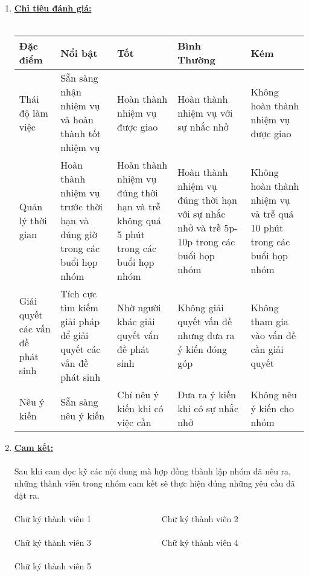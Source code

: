 \documentclass[12pt]{article}
\begin{document}
\begin{enumerate}
	\item \textbf{\uline{Chỉ tiêu đánh giá:}} \\\\
	\begin{tabular}{|>{\centering\arraybackslash}m{2.52cm}|>{\centering\arraybackslash}m{2.52cm}|>{\centering\arraybackslash}m{2.52cm}|>{\centering\arraybackslash}m{2.52cm}|>{\centering\arraybackslash}m{2.52cm}|}
		\hline
		Đặc điểm & Nổi bật & Tốt & Bình Thường & Kém \\
		\hline
		Thái độ làm việc & Sẵn sàng nhận nhiệm vụ và hoàn thành tốt nhiệm vụ & Hoàn thành nhiệm vụ được giao & Hoàn thành nhiệm vụ với sự nhắc nhở & Không hoàn thành nhiệm vụ được giao \\
		\hline
		Quản lý thời gian & Hoàn thành nhiệm vụ trước thời hạn và đúng giờ trong các buổi họp nhóm & Hoàn thành nhiệm vụ đúng thời hạn và trễ không quá 5 phút trong các buổi họp nhóm & Hoàn thành nhiệm vụ đúng thời hạn với sự nhắc nhở và trễ 5p-10p trong các buổi họp nhóm & Không hoàn thành nhiệm vụ và trễ quá 10 phút trong các buổi họp nhóm \\
		\hline
		Giải quyết các vấn đề phát sinh & Tích cực tìm kiếm giải pháp để giải quyết các vấn đề phát sinh & Nhờ người khác giải quyết vấn đề phát sinh & Không giải quyết vấn đề nhưng đưa ra ý kiến đóng góp & Không tham gia vào vấn đề cần giải quyết \\
		\hline
		Nêu ý kiến & Sẵn sàng nêu ý kiến & Chỉ nêu ý kiến khi có việc cần & Đưa ra ý kiến khi có sự nhắc nhở & Không nêu ý kiến cho nhóm \\
		\hline
	\end{tabular}
	\pagebreak
	\item \textbf{\uline{Cam kết:}}\\\\
	Sau khi cam đọc kỹ các nội dung mà hợp đồng thành lập nhóm đã nêu ra, những thành viên trong nhóm cam kết sẽ thực hiện đúng những yêu cầu đã đặt ra.
	\\\\
	Chữ ký thành viên 1 \ \ \ \ \ \ \ \ \ \ \ \ \ \ \ \ Chữ ký thành viên 2
	\\\\
	Chữ ký thành viên 3 \ \ \ \ \ \ \ \ \ \ \ \ \ \ \ \ Chữ ký thành viên 4
	\\\\
	Chữ ký thành viên 5
	\end{enumerate}
\end{document}
